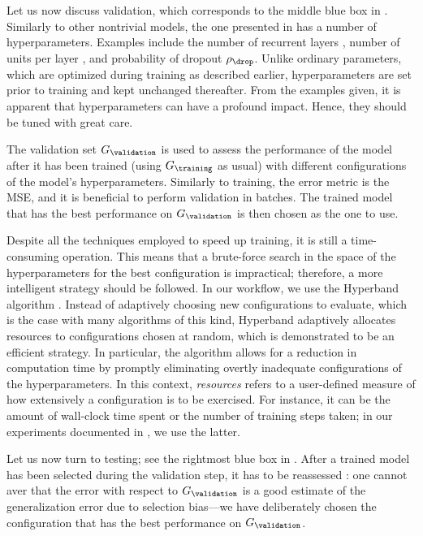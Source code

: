 Let us now discuss validation, which corresponds to the middle blue box in
. Similarly to other nontrivial models, the one presented
in  has a number of hyperparameters. Examples
include the number of recurrent layers \nl, number of units per layer \nu, and
probability of dropout $\rho_\drop$. Unlike ordinary parameters, which are
optimized during training as described earlier, hyperparameters are set prior to
training and kept unchanged thereafter. From the examples given, it is apparent
that hyperparameters can have a profound impact. Hence, they should be tuned
with great care.

The validation set $G_\validation$ is used to assess the performance of the
model after it has been trained (using $G_\training$ as usual) with different
configurations of the model's hyperparameters. Similarly to training, the error
metric is the \ac{MSE}, and it is beneficial to perform validation in batches.
The trained model that has the best performance on $G_\validation$ is then
chosen as the one to use.

Despite all the techniques employed to speed up training, it is still a
time-consuming operation. This means that a brute-force search in the space of
the hyperparameters for the best configuration is impractical; therefore, a more
intelligent strategy should be followed. In our workflow, we use the Hyperband
algorithm \cite{li2016}. Instead of adaptively choosing new configurations to
evaluate, which is the case with many algorithms of this kind, Hyperband
adaptively allocates resources to configurations chosen at random, which is
demonstrated to be an efficient strategy. In particular, the algorithm allows
for a reduction in computation time by promptly eliminating overtly inadequate
configurations of the hyperparameters. In this context, \emph{resources} refers
to a user-defined measure of how extensively a configuration is to be exercised.
For instance, it can be the amount of wall-clock time spent or the number of
training steps taken; in our experiments documented in , we
use the latter.

Let us now turn to testing; see the rightmost blue box in .
After a trained model has been selected during the validation step, it has to be
reassessed \cite{hastie2013}: one cannot aver that the error with respect to
$G_\validation$ is a good estimate of the generalization error due to selection
bias---we have deliberately chosen the configuration that has the best
performance on $G_\validation$.

